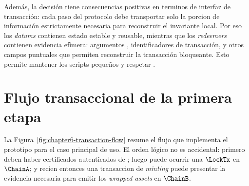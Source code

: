 Además, la decisión tiene consecuencias positivas en terminos de interfaz de transacción: cada paso del protocolo debe transportar solo la porcion de información estrictamente necesaria para reconstruir el invariante local. Por eso los \textit{datums} contienen estado estable y reusable, mientras que los \textit{redeemers} contienen evidencia efímera: argumentos \ZK, identificadores de transacción, y otros campos puntuales que permiten reconstruir la transacción bloqueante. Esto permite mantener los scripts pequeños y respetar \maxTxSize.

\section{Flujo transaccional de la primera etapa}

La Figura~\ref{fig:chapter6-transaction-flow} resume el flujo que implementa el prototipo para el caso principal de uso. El orden lógico no es accidental: primero deben haber certificados autenticados de \StakeDistribution; luego puede ocurrir una $\LockTx$ en $\ChainA$; y recien entonces una transaccion de \textit{minting} puede presentar la evidencia necesaria para emitir los \textit{wrapped assets} en $\ChainB$.

